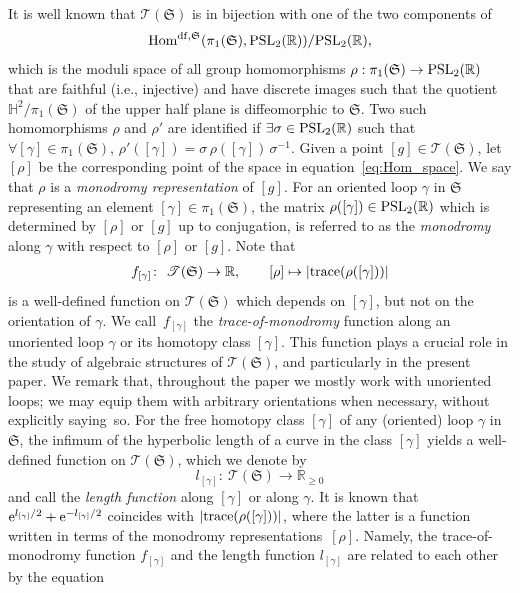 \documentclass[pdftex]{sigma}
\numberwithin{equation}{section}
\theoremstyle{definition}
\begin{document}
It is well known that $\mathscr{T}(\mathfrak{S})$ is in bijection with one of the two components of
\begin{align}
\label{eq:Hom_space}
{\rm Hom}^{{\rm df},\mathfrak{S}}(\pi_1(\mathfrak{S}), {\rm PSL}_2(\mathbb{R}))/{\rm PSL}_2(\mathbb{R}),
\end{align}
which is the moduli space of all group homomorphisms $\rho : \pi_1(\mathfrak{S}) \to {\rm PSL}_2(\mathbb{R})$ that are faithful (i.e., injective) and have discrete images such that the quotient $\mathbb{H}^2 /\pi_1(\mathfrak{S})$ of the upper half plane is diffeomorphic to $\mathfrak{S}$. Two such homomorphisms $\rho$ and $\rho'$ are identified if $\exists \sigma \in {\rm PSL}_2(\mathbb{R})$ such that $\forall [\gamma] \in \pi_1(\mathfrak{S})$, $\rho'([\gamma]) = \sigma \, \rho([\gamma]) \, \sigma^{-1}$.
Given a point $[g] \in \mathscr{T}(\mathfrak{S})$, let $[\rho]$ be the corresponding point of the space in equation~\eqref{eq:Hom_space}. We say that $\rho$ is a {\em monodromy representation} of $[g]$. For an oriented loop $\gamma$ in $\mathfrak{S}$ representing an element $[\gamma] \in \pi_1(\mathfrak{S})$, the matrix $\rho([\gamma]) \in {\rm PSL}_2(\mathbb{R})$ which is determined by $[\rho]$ or $[g]$ up to conjugation, is referred to as the {\em monodromy} along $\gamma$ with respect to $[\rho]$ or $[g]$. Note that
\begin{align*}
f_{[\gamma]} \colon \ \mathscr{T}(\mathfrak{S}) \to \mathbb{R}, \qquad [\rho] \mapsto |{\rm trace}(\rho([\gamma]))|
\end{align*}
is a well-defined function on $\mathscr{T}(\mathfrak{S})$ which depends on $[\gamma]$, but not on the orientation of $\gamma$. We call~$f_{[\gamma]}$ the {\em trace-of-monodromy} function along an unoriented loop $\gamma$ or its homotopy class $[\gamma]$. This function plays a crucial role in the study of algebraic structures of $\mathscr{T}(\mathfrak{S})$, and particularly in the present paper. We remark that, throughout the paper we mostly work with unoriented loops; we may equip them with arbitrary orientations when necessary, without explicitly saying~so.
For the free homotopy class $[\gamma]$ of any (oriented) loop $\gamma$ in $\mathfrak{S}$, the infimum of the hyperbolic length of a curve in the class $[\gamma]$ yields a well-defined function on $\mathscr{T}(\mathfrak{S})$, which we denote by
\[
l_{[\gamma]} \colon \ \mathscr{T}(\mathfrak{S}) \to \mathbb{R}_{\ge 0}
\]
and call the {\em length function} along $[\gamma]$ or along $\gamma$. It is known that ${\rm e}^{l_{[\gamma]}/2} + {\rm e}^{-l_{[\gamma]}/2}$ coincides with $|{\rm trace}(\rho([\gamma]))|$, where the latter is a function written in terms of the monodromy representations~$[\rho]$. Namely, the trace-of-monodromy function $f_{[\gamma]}$ and the length function $l_{[\gamma]}$ are related to each other by the equation
\end{document}
